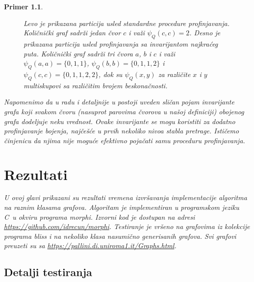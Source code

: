 \documentclass[12pt,oneside]{memoir}
\newtheorem{example}{Primer}
\theoremstyle{definition}
\def\CC{{C\nolinebreak[4]\hspace{-.05em}\raisebox{.4ex}{\tiny\bf ++}}}
\begin{document}
\begin{example}
\begin{figure}[htp]
	   \caption{Levo je prikazana particija usled standardne procedure
	   profinjavanja. Količnički graf sadrži jedan čvor $c$ i važi $\psi_Q(c, c)
	   = 2$. Desno je prikazana particija usled profinjavanja sa invarijantom
	   najkraćeg puta. Količnički graf sadrži tri čvora {\color{red}$a$},
	   {\color{green}$b$} i {\color{blue}$c$} i važi $\psi_Q( a, a) = \{0, 1,
	   1\}$, $\psi_Q(b, b) = \{0, 1, 1, 2\}$ i $\psi_Q(c, c) = \{0, 1, 1, 2, 2\}$,
	   dok su $\psi_Q(x, y)$ za različite $x$ i $y$ multiskupovi sa različitim
	   brojem beskonačnosti.}
	   \label{img:graphinv}
   \end{figure}

   Napomenimo da u radu \cite{McKay} i detaljnije u \cite{nug} postoji uveden
   sličan pojam invarijante grafa koji svakom čvoru (nasuprot parovima čvorova
   u našoj definiciji) obojenog grafa dodeljuje neku vrednost. Ovake
   invarijante se mogu koristiti za dodatno profinjavanje bojenja, najčešće u
   prvih nekoliko nivoa stabla pretrage. Ističemo činjenicu da njima nije
   moguće efektivno pojačati samu proceduru profinjavanja.

\chapter{Rezultati}

  U ovoj glavi prikazani su rezultati vremena izvršavanja implementacije
  algoritma na raznim klasama grafova. Algoritam je implementiran u programskom
  jeziku \CC\ u okviru programa \emph{morphi}. Izvorni kod je dostupan na
  adresi \url{https://github.com/idrecun/morphi}.  Testiranje je vršeno na
  grafovima iz kolekcije programa \emph{bliss} i na nekoliko klasa
  nasumično generisanih grafova. Svi grafovi preuzeti su sa
  \url{https://pallini.di.uniroma1.it/Graphs.html}.

  \section{Detalji testiranja}


\end{example}
\end{document}
